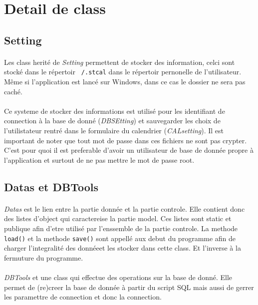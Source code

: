 \documentclass[a4paper,10pt]{report}
\begin{document}
	\section{Detail de class}

		\subsection{Setting}

			\paragraph*{}
			Les class herité de \textit{Setting} permettent de stocker des information, celci sont stocké dans le répertoir \texttt{~/.stcal} dans le répertoir pernonelle de l'utilisateur. Même si l'application est lancé sur Windows, dans ce cas le dossier ne sera pas caché.
			
			\paragraph*{}
			Ce systeme de stocker des informations est utilisé pour les identifiant de connection à la base de donné (\textit{DBSEtting}) et sauvegarder les choix de l'utilistateur rentré dans le formulaire du calendrier (\textit{CALsetting}). Il est important de noter que tout mot de passe dans ces fichiers ne sont pas crypter. C'est pour quoi il est preferable d'avoir un utilisateur de base de donnée propre à l'application et surtout de ne pas mettre le mot de passe root.

		\subsection{Datas et DBTools}

			\paragraph*{}
			\textit{Datas} est le lien entre la partie donnée et la partie controle. Elle contient donc des listes d'object qui caractereise la partie model. Ces listes sont static et publique afin d'etre utilisé par l'enssemble de la partie controle.
			La methode \texttt{load()} et la methode \texttt{save()} sont appellé aux debut du programme afin de charger l'integralité des donnéeet les stocker dans cette class. Et l'inverse à la fermuture du programme.

			\paragraph*{}
			\textit{DBTools} et une class qui effectue des operations sur la base de donné. Elle permet de (re)creer la base de donnée à partir du script SQL mais aussi de gerrer les paramettre de connection et donc la connection.
\end{document}
